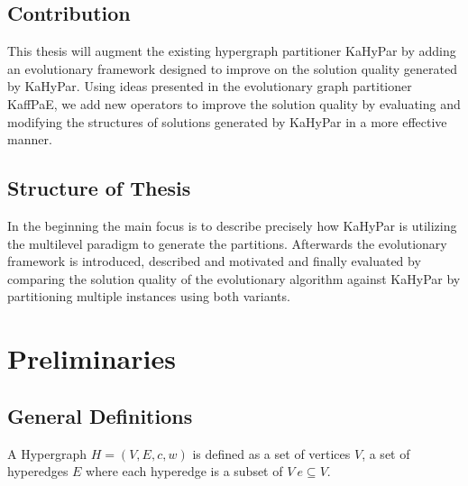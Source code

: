 \documentclass[a4paper,12pt,titlepage, BCOR7mm,headsepline]{scrbook}
\numberwithin{equation}{section}
\begin{document}
\section{Contribution}
This thesis will augment the existing hypergraph partitioner KaHyPar by adding an evolutionary framework designed to improve on the solution quality generated by KaHyPar. Using ideas presented in the evolutionary graph partitioner KaffPaE, we add new operators to improve the solution quality by evaluating and modifying the structures of solutions generated by KaHyPar in a more effective manner. 
\section{Structure of Thesis}
In the beginning the main focus is to describe precisely how KaHyPar is utilizing the multilevel paradigm to generate the partitions. Afterwards the evolutionary framework is introduced, described and motivated and finally evaluated by comparing the solution quality of the evolutionary algorithm against KaHyPar by partitioning multiple instances using both variants. 
\chapter{Preliminaries}
\section{General Definitions}

A Hypergraph $H = (V, E, c, w)$ is defined as a set of vertices $V$, a set of hyperedges $E$ where each hyperedge is a subset of $V \ e \subseteq V$.
\end{document}
